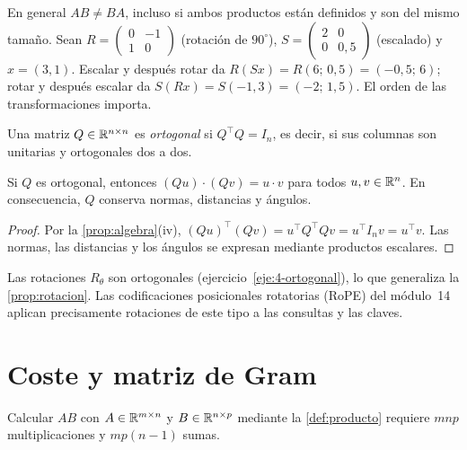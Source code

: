 \begin{observacion}[No conmutatividad]\label{obs:no-conmuta}
En general $AB\neq BA$, incluso si ambos productos están definidos y son del mismo tamaño. Sean $R=\begin{pmatrix}0&-1\\1&0\end{pmatrix}$ (rotación de $90^\circ$), $S=\begin{pmatrix}2&0\\0&0{,}5\end{pmatrix}$ (escalado) y $x=(3,1)$. Escalar y después rotar da $R(Sx)=R(6;\,0{,}5)=(-0{,}5;\,6)$; rotar y después escalar da $S(Rx)=S(-1,3)=(-2;\,1{,}5)$. El orden de las transformaciones importa.
\end{observacion}

\begin{definicion}\label{def:ortogonal}
Una matriz $Q\in\mathbb{R}^{n\times n}$ es \emph{ortogonal} si $Q^{\top}Q=I_n$, es decir, si sus columnas son unitarias y ortogonales dos a dos.
\end{definicion}

\begin{proposicion}\label{prop:ortogonal}
Si $Q$ es ortogonal, entonces $(Qu)\cdot(Qv)=u\cdot v$ para todos $u,v\in\mathbb{R}^{n}$. En consecuencia, $Q$ conserva normas, distancias y ángulos.
\end{proposicion}

\begin{proof}
Por la \cref{prop:algebra}(iv), $(Qu)^{\top}(Qv)=u^{\top}Q^{\top}Qv=u^{\top}I_nv=u^{\top}v$. Las normas, las distancias y los ángulos se expresan mediante productos escalares.
\end{proof}

Las rotaciones $R_\theta$ son ortogonales (ejercicio~\ref{eje:4-ortogonal}), lo que generaliza la \cref{prop:rotacion}. Las codificaciones posicionales rotatorias (RoPE) del módulo~14 aplican precisamente rotaciones de este tipo a las consultas y las claves.

\section{Coste y matriz de Gram}

\begin{proposicion}\label{prop:coste}
Calcular $AB$ con $A\in\mathbb{R}^{m\times n}$ y $B\in\mathbb{R}^{n\times p}$ mediante la \cref{def:producto} requiere $mnp$ multiplicaciones y $mp(n-1)$ sumas.
\end{proposicion}

